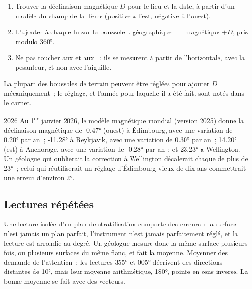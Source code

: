 \begin{method}\label{met:b1:field-lab-methods-1:declination}
\begin{enumerate}
  \item Trouver la déclinaison magnétique $D$ pour le lieu et la date, à partir
        d'un modèle du champ de la Terre (positive à l'est, négative à l'ouest).
  \item L'ajouter à chaque  lu sur la boussole~:  géographique $=$
         magnétique $+ D$, pris modulo \ang{360}.
  \item Ne pas toucher aux  et aux ~: ils se mesurent à partir
        de l'horizontale, avec la pesanteur, et non avec l'aiguille.
\end{enumerate}
La plupart des boussoles de terrain peuvent être réglées pour ajouter $D$
mécaniquement~; le réglage, et l'année pour laquelle il a été fait, sont notés
dans le carnet.
\end{method}

\begin{dated}{2026}
Au 1\textsuperscript{er} janvier 2026, le modèle magnétique mondial (version
2025) donne la déclinaison magnétique de \ang{-0.47} (ouest) à Édimbourg, avec
une variation de \ang{+0.20} par an~; \ang{-11.28} à Reykjavik, avec une
variation de \ang{+0.30} par an~; \ang{+14.20} (est) à Anchorage, avec une
variation de \ang{-0.28} par an~; et \ang{+23.23} à Wellington. Un géologue qui
oublierait la correction à Wellington décalerait chaque  de plus de
\ang{23}~; celui qui réutiliserait un réglage d'Édimbourg vieux de dix ans
commettrait une erreur d'environ \ang{2}.
\end{dated}

\subsection{Lectures répétées}

Une lecture isolée d'un plan de stratification comporte des erreurs~: la surface
n'est jamais un plan parfait, l'instrument n'est jamais parfaitement réglé, et la
lecture est arrondie au degré. Un géologue mesure donc la même surface plusieurs
fois, ou plusieurs surfaces du même flanc, et fait la moyenne. Moyenner des
 demande de l'attention~: les lectures \ang{355} et \ang{005} décrivent
des directions distantes de \ang{10}, mais leur moyenne arithmétique, \ang{180},
pointe en sens inverse. La bonne moyenne se fait avec des vecteurs.

